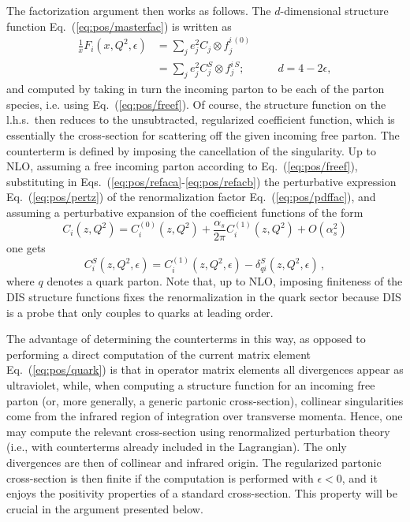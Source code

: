 The factorization argument then works as follows. The $d$-dimensional structure
function Eq.~(\ref{eq:pos/masterfac}) is
written as
\begin{align} \label{eq:pos/refaca}
 \frac{1}{x} F_i(x,Q^2,\epsilon)&=\sum_{j} e^2_j C_j \otimes f_j^{i\,(0)} \\
&=\sum_{j} e^2_j C_j^S \otimes f_j^{i\,S};\qquad\quad d=4-2\epsilon,
\label{eq:pos/refacb}
\end{align}
and computed by taking in turn  the incoming parton to be each of the
parton species, i.e. using Eq.~(\ref{eq:pos/freef}).
  Of course, the structure
function on the l.h.s.\ then reduces to the
unsubtracted, regularized coefficient
function, which is essentially the cross-section for scattering off
the given incoming free parton. The counterterm is defined by imposing the
cancellation of the singularity. Up to NLO, assuming a free incoming
parton according to Eq.~(\ref{eq:pos/freef}), substituting in
Eqs.~(\ref{eq:pos/refaca}-\ref{eq:pos/refacb}) the
perturbative expression Eq.~(\ref{eq:pos/pertz}) of the 
renormalization factor Eq.~(\ref{eq:pos/pdffac}), and assuming a
perturbative expansion of the coefficient functions of the form
\begin{equation}\label{eq:pos/perc}
  C_i(z,Q^2)= C^{(0)}_i(z,Q^2)+\frac{\alpha_s}{2\pi} C^{(1)}_i(z,Q^2)+O(\alpha_s^2)
\end{equation} 
one gets
\begin{equation}\label{eq:pos/renorm}
    C_i^S(z,Q^2,\epsilon) = 
    {C^{(1)}_{i}}(z,Q^2,\epsilon)
    -\delta_{qi}^S(z,Q^2,\epsilon)\,,
\end{equation}
where $q$ denotes a quark parton.
Note that, up to NLO, imposing finiteness of the DIS structure
functions fixes the renormalization in the quark sector because DIS is
a probe that only couples to quarks at leading order.

The advantage of determining the counterterms in this way, as opposed
to performing a direct computation of the current matrix element
Eq.~(\ref{eq:pos/quark}) is that in  operator matrix
elements all divergences appear as ultraviolet, while, when computing a
structure function for an incoming free parton  (or, more
generally, a generic partonic cross-section), collinear singularities
come from the infrared region of integration over
transverse momenta. Hence, one may compute the relevant
cross-section using renormalized perturbation theory (i.e., with
counterterms already included in the Lagrangian). The only divergences
are then of collinear and infrared origin.
The regularized partonic cross-section is
then finite if the computation is
performed with $\epsilon<0$, and it enjoys the positivity
properties of a standard 
cross-section. This property will be crucial in the argument presented
 below.

